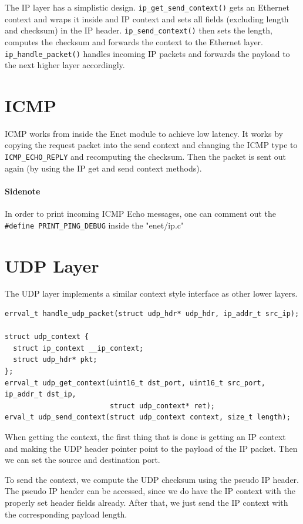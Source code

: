 The IP layer has a simplistic design. \texttt{ip_get_send_context()} gets an Ethernet context and wraps it inside and IP context and sets all fields (excluding length and checksum) in the IP header. \texttt{ip_send_context()} then sets the length, computes the checksum and forwards the context to the Ethernet layer. \texttt{ip_handle_packet()} handles incoming IP packets and forwards the payload to the next higher layer accordingly.

\section{ICMP}
 ICMP works from inside the Enet module to achieve low latency. It works by copying the request packet into the send context and changing the ICMP type to \texttt{ICMP_ECHO_REPLY} and recomputing the checksum. Then the packet is sent out again (by using the IP get and send context methods).
 
 \paragraph{Sidenote}
 In order to print incoming ICMP Echo messages, one can comment out the \\ \texttt{#define PRINT_PING_DEBUG} inside the "enet/ip.c"


\section{UDP Layer}

The UDP layer implements a similar context style interface as other lower layers.
\begin{verbatim}
errval_t handle_udp_packet(struct udp_hdr* udp_hdr, ip_addr_t src_ip);

struct udp_context {
  struct ip_context __ip_context;
  struct udp_hdr* pkt;
};
errval_t udp_get_context(uint16_t dst_port, uint16_t src_port, ip_addr_t dst_ip, 
                         struct udp_context* ret);
erval_t udp_send_context(struct udp_context context, size_t length);
\end{verbatim}

When getting the context, the first thing that is done is getting an IP context and making the UDP header pointer point to the payload of the IP packet. Then we can set the source and destination port.

To send the context, we compute the UDP checksum using the pseudo IP header. The pseudo IP header can be accessed, since we do have the IP context with the properly set header fields already. After that, we just send the IP context with the corresponding payload length.

